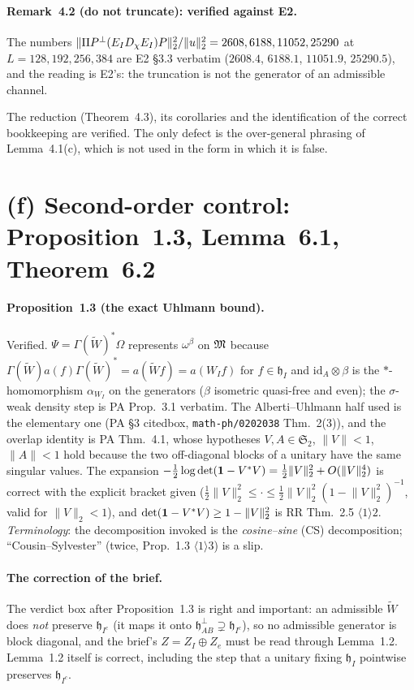 \documentclass[11pt]{article}
\newcommand{\Wt}{\widetilde W}\newcommand{\Om}{\Omega}\newcommand{\Gm}{\Gamma}
\newcommand{\Stwo}{\mathfrak S_2}\newcommand{\Sone}{\mathfrak S_1}
\newcommand{\norm}[1]{\lVert #1\rVert}\newcommand{\abs}[1]{\lvert #1\rvert}
\begin{document}
\paragraph{Remark~4.2 (do not truncate): verified against E2.}  The numbers
$\norm{\Pi\Pperp(E_ID_\chi E_I)P}_2^2/\norm u_2^2=2608,6188,11052,25290$ at
$L=128,192,256,384$ are E2 \S3.3 verbatim ($2608.4$, $6188.1$, $11051.9$, $25290.5$), and
the reading is E2's: the truncation is not the generator of an admissible channel.

\begin{verdictok}
The reduction (Theorem~4.3), its corollaries and the identification of the correct
bookkeeping are verified.  The only defect is the over-general phrasing of Lemma~4.1(c),
which is not used in the form in which it is false.
\end{verdictok}

\section{(f) Second-order control: Proposition~1.3, Lemma~6.1, Theorem~6.2}\label{sec:f}

\paragraph{Proposition~1.3 (the exact Uhlmann bound).}  Verified.  $\Psi=\Gm(\Wt)^*\Om$
represents $\omega^\beta$ on $\mathfrak M$ because $\Gm(\Wt)a(f)\Gm(\Wt)^*=a(\Wt f)=a(W_If)$ for
$f\in\mathfrak h_I$ and $\mathrm{id}_A\otimes\beta$ is the $*$-homomorphism $\alpha_{W_I}$
on the generators ($\beta$ isometric quasi-free and even); the $\sigma$-weak density step is
PA Prop.~3.1 verbatim.  The Alberti--Uhlmann half used is the elementary one (PA \S3
citedbox, \texttt{math-ph/0202038} Thm.~2(3)), and the overlap identity is PA Thm.~4.1,
whose hypotheses $V,A\in\Stwo$, $\norm V<1$, $\norm A<1$ hold because the two off-diagonal
blocks of a unitary have the same singular values.  The expansion
$-\tfrac12\log\det(\one-V^*V)=\tfrac12\norm V_2^2+O(\norm V_2^4)$ is correct with the
explicit bracket given ($\tfrac12\norm V_2^2\le\cdot\le\tfrac12\norm V_2^2(1-\norm V_2^2)^{-1}$,
valid for $\norm V_2<1$), and $\det(\one-V^*V)\ge1-\norm V_2^2$ is RR Thm.~2.5 $\langle1\rangle2$.
\emph{Terminology}: the decomposition invoked is the \emph{cosine--sine} (CS) decomposition;
``Cousin--Sylvester'' (twice, Prop.~1.3 $\langle1\rangle3$) is a slip.

\paragraph{The correction of the brief.}  The verdict box after Proposition~1.3 is right and
important: an admissible $\Wt$ does \emph{not} preserve $\mathfrak h_{I^c}$ (it maps it onto
$\mathfrak h_{AB}^{\perp}\supsetneq\mathfrak h_{I^c}$), so no admissible generator is block
diagonal, and the brief's $Z=Z_I\oplus Z_e$ must be read through Lemma~1.2.  Lemma~1.2 itself
is correct, including the step that a unitary fixing $\mathfrak h_I$ pointwise preserves
$\mathfrak h_{I^c}$.
\end{document}
